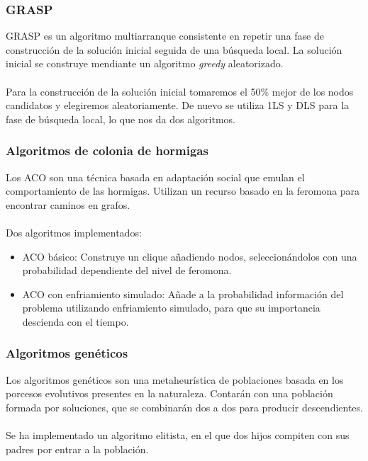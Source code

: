 \documentclass{beamer}
\begin{document}

\begin{frame}
  \frametitle{GRASP}
  GRASP es un algoritmo multiarranque consistente en repetir una fase de construcción de la solución inicial seguida de una búsqueda local.
  La solución inicial se construye mendiante un algoritmo \textit{greedy} aleatorizado. \\~\\

  Para la construcción de la solución inicial tomaremos el 50\% mejor de los nodos candidatos y elegiremos aleatoriamente.
  De nuevo se utiliza 1LS y DLS para la fase de búsqueda local, lo que nos da dos algoritmos.

\end{frame}



\begin{frame}
  \frametitle{Algoritmos de colonia de hormigas}
  Los ACO son una técnica basada en adaptación social que emulan el comportamiento de las hormigas. Utilizan un recurso basado en
  la feromona para encontrar caminos en grafos.  \\~\\

  Dos algoritmos implementados:
  \begin{itemize}
    \item ACO básico: Construye un clique añadiendo nodos, seleccionándolos con una probabilidad dependiente del nivel de feromona.
    \item ACO con enfriamiento simulado: Añade a la probabilidad información del problema utilizando enfriamiento simulado, para
          que su importancia descienda con el tiempo.
 \end{itemize}

\end{frame}



\begin{frame}
  \frametitle{Algoritmos genéticos}
  Los algoritmos genéticos son una metaheurística de poblaciones basada en los porcesos evolutivos presentes en la naturaleza.
  Contarán con una población formada por soluciones, que se combinarán dos a dos para producir descendientes. \\~\\

  Se ha implementado un algoritmo elitista, en el que dos hijos compiten con sus padres por entrar a la población.

\end{frame}
\end{document}
